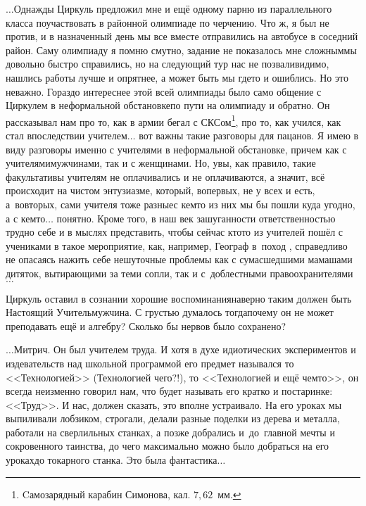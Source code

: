 $\ldots$Однажды Циркуль предложил мне и ещё одному парню из параллельного класса поучаствовать в районной олимпиаде по черчению. Что ж, я был не против, и в назначенный день мы все вместе отправились на автобусе в соседний район. Саму олимпиаду я помню смутно, задание не показалось мне сложным\mdash мы довольно быстро справились, но на следующий тур нас не позвали\mdash видимо, нашлись работы лучше и опрятнее, а может быть мы где\sdash то и ошиблись. Но это неважно. Гораздо интереснее этой всей олимпиады было само общение с Циркулем в неформальной обстановке\mdash по пути на олимпиаду и обратно. Он рассказывал нам про то, как в армии бегал с СКС\sdash ом\footnote{Cамозарядный карабин Симонова, кал. $7,62$~мм.}, про то, как учился, как стал впоследствии учителем$\ldots$ вот важны такие разговоры для пацанов. Я имею в виду разговоры именно с учителями в неформальной обстановке, причем как с учителями\sdash мужчинами, так и с женщинами. Но, увы, как правило, такие факультативы учителям не оплачивались и не оплачиваются, а значит, всё происходит на чистом энтузиазме, который, во\sdash первых, не у всех и есть, а~во\sdash вторых, сами учителя тоже разные\mdash с кем\sdash то из них мы бы пошли куда угодно, а с кем\sdash то$\ldots$ понятно. Кроме того, в наш век зашуганности ответственностью трудно себе и в мыслях представить, чтобы сейчас кто\sdash то из учителей пошёл с учениками в такое мероприятие, как, например, Географ в~поход \cite{ГеографГлобусПропил}, справедливо не опасаясь нажить себе нешуточные проблемы как с сумасшедшими мамашами дитяток, вытирающими за теми сопли, так и с~доблестными правоохранителями$\ldots$

Циркуль оставил в сознании хорошие воспоминания\mdash наверно таким должен быть Настоящий Учитель\sdash мужчина. С грустью думалось тогда\mdash почему он не может преподавать ещё и алгебру? Сколько бы нервов было сохранено?
%
%
%
%
%



\vspace{1.0cm}
$\ldots$Митрич. Он был учителем труда. И хотя в духе идиотических экспериментов и издевательств над школьной программой его предмет назывался то <<Технологией>> (Технологией чего?!), то <<Технологией и ещё чем\sdash то>>, он всегда неизменно говорил нам, что будет называть его кратко и по\sdash старинке: <<Труд>>. И нас, должен сказать, это вполне устраивало. На его уроках мы выпиливали лобзиком, строгали, делали разные поделки из дерева и металла, работали на сверлильных станках, а позже добрались и~до~главной мечты и сокровенного таинства, до чего максимально можно было добраться на его уроках\mdash до токарного станка. Это была фантастика$\ldots$

